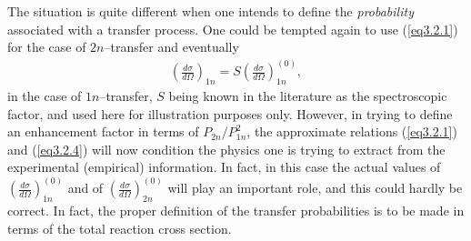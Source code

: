 The situation is  quite different when one intends to define the \textit{probability} associated with a transfer process. One could be tempted again to use (\ref{eq3.2.1}) for the case of $2n$--transfer and eventually
\begin{align}\label{eq3.2.4}
\left(\frac{d\sigma}{d\Omega}\right)_{1n}=S\left(\frac{d\sigma}{d\Omega}\right)_{1n}^{(0)},
\end{align}
in the case of $1n$--transfer, $S$ being known in the literature as the spectroscopic factor, and used here for illustration purposes only. However, in trying to define an enhancement factor in terms of $P_{2n}/P_{1n}^2$, the approximate relations (\ref{eq3.2.1}) and (\ref{eq3.2.4}) will now condition the physics one is trying to extract from the experimental (empirical) information. In fact, in this case the actual values of $\left(\frac{d\sigma}{d\Omega}\right)_{1n}^{(0)}$ and of $\left(\frac{d\sigma}{d\Omega}\right)_{2n}^{(0)}$ will play an important role, and this could hardly be  correct. In fact, the proper definition of the transfer probabilities is to be made in terms of the total reaction cross section.


